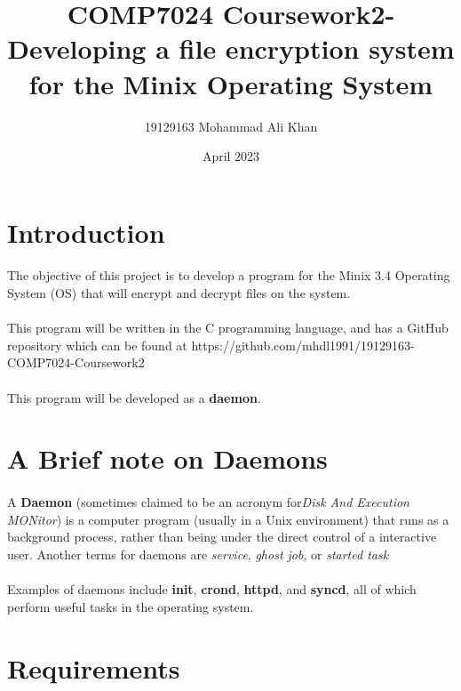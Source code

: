 \documentclass{article}
\title{COMP7024 Coursework2- Developing a file encryption system for the Minix Operating System}
\author{19129163 Mohammad Ali Khan}
\date{April 2023}
\begin{document}
\maketitle

\section{Introduction}
    \paragraph{}The objective of this project is to develop a program for the Minix 3.4 Operating System (OS) that will encrypt and decrypt files on the system.
    \paragraph{}This program will be written in the C programming language, and has a GitHub repository which can be found at https://github.com/mhdl1991/19129163-COMP7024-Coursework2
    \paragraph{}This program will be developed as a \textbf{daemon}.

\section{A Brief note on Daemons}
    \paragraph{}A \textbf{Daemon} (sometimes claimed to be an acronym for\textit{Disk And Execution MONitor}) is a computer program (usually in a Unix environment) that runs as a background process, rather than being under the direct control of a interactive user. Another terms for daemons are \textit{service}, \textit{ghost job}, or \textit{started task}
    \paragraph{}Examples of daemons include \textbf{init}, \textbf{crond}, \textbf{httpd}, and \textbf{syncd}, all of which perform useful tasks in the operating system.

\section{Requirements}
\end{document}
